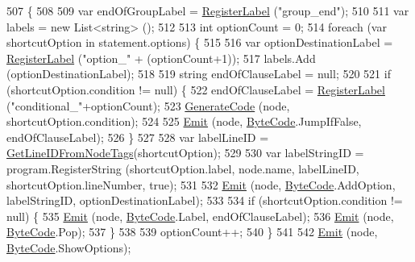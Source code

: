 \begin{DoxyCode}
507                                                                            \{
508 
509             var endOfGroupLabel = \hyperlink{a00034_a1bae0d8b701a59708641aa36ea971fa5}{RegisterLabel} (\textcolor{stringliteral}{"group\_end"});
510 
511             var labels = \textcolor{keyword}{new} List<string> ();
512 
513             \textcolor{keywordtype}{int} optionCount = 0;
514             \textcolor{keywordflow}{foreach} (var shortcutOption \textcolor{keywordflow}{in} statement.options) \{
515 
516                 var optionDestinationLabel = \hyperlink{a00034_a1bae0d8b701a59708641aa36ea971fa5}{RegisterLabel} (\textcolor{stringliteral}{"option\_"} + (optionCount+1));
517                 labels.Add (optionDestinationLabel);
518 
519                 \textcolor{keywordtype}{string} endOfClauseLabel = null;
520 
521                 \textcolor{keywordflow}{if} (shortcutOption.condition != null) \{
522                     endOfClauseLabel = \hyperlink{a00034_a1bae0d8b701a59708641aa36ea971fa5}{RegisterLabel} (\textcolor{stringliteral}{"conditional\_"}+optionCount);
523                     \hyperlink{a00034_a006f3becd521cc179ba3d3352f6f930b}{GenerateCode} (node, shortcutOption.condition);
524 
525                     \hyperlink{a00034_a774e8c143cdda0584fcfdda98626a83c}{Emit} (node, \hyperlink{a00031_ad5dfb6ee68ca7469623ad3e459f98894}{ByteCode}.JumpIfFalse, endOfClauseLabel);
526                 \}
527 
528                 var labelLineID = \hyperlink{a00034_a5117b9c2253de15d3fd3557c8b037235}{GetLineIDFromNodeTags}(shortcutOption);
529 
530                 var labelStringID = program.RegisterString (shortcutOption.label, node.name, labelLineID, 
      shortcutOption.lineNumber, \textcolor{keyword}{true});
531 
532                 \hyperlink{a00034_a774e8c143cdda0584fcfdda98626a83c}{Emit} (node, \hyperlink{a00031_ad5dfb6ee68ca7469623ad3e459f98894}{ByteCode}.AddOption, labelStringID, optionDestinationLabel);
533 
534                 \textcolor{keywordflow}{if} (shortcutOption.condition != null) \{
535                     \hyperlink{a00034_a774e8c143cdda0584fcfdda98626a83c}{Emit} (node, \hyperlink{a00031_ad5dfb6ee68ca7469623ad3e459f98894}{ByteCode}.Label, endOfClauseLabel);
536                     \hyperlink{a00034_a774e8c143cdda0584fcfdda98626a83c}{Emit} (node, \hyperlink{a00031_ad5dfb6ee68ca7469623ad3e459f98894}{ByteCode}.Pop);
537                 \}
538 
539                 optionCount++;
540             \}
541 
542             \hyperlink{a00034_a774e8c143cdda0584fcfdda98626a83c}{Emit} (node, \hyperlink{a00031_ad5dfb6ee68ca7469623ad3e459f98894}{ByteCode}.ShowOptions);

\end{DoxyCode}
